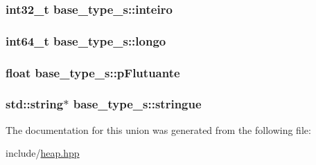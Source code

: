 \hypertarget{unionbase__type__s_aa8aa0d18e53aaef1b14d4c87779938ba}{
\subsubsection[{inteiro}]{\setlength{\rightskip}{0pt plus 5cm}int32\+\_\+t base\+\_\+type\+\_\+s\+::inteiro}}\label{unionbase__type__s_aa8aa0d18e53aaef1b14d4c87779938ba}
\hypertarget{unionbase__type__s_a1bcfa1e04911f2503e87dacad3d9fe21}{
\subsubsection[{longo}]{\setlength{\rightskip}{0pt plus 5cm}int64\+\_\+t base\+\_\+type\+\_\+s\+::longo}}\label{unionbase__type__s_a1bcfa1e04911f2503e87dacad3d9fe21}
\hypertarget{unionbase__type__s_aeb2c8259e1193e8480d6316abe158b0f}{
\subsubsection[{p\+Flutuante}]{\setlength{\rightskip}{0pt plus 5cm}float base\+\_\+type\+\_\+s\+::p\+Flutuante}}\label{unionbase__type__s_aeb2c8259e1193e8480d6316abe158b0f}
\hypertarget{unionbase__type__s_ab246b2b35057f95ce992e7083086bae5}{
\subsubsection[{stringue}]{\setlength{\rightskip}{0pt plus 5cm}std\+::string$\ast$ base\+\_\+type\+\_\+s\+::stringue}}\label{unionbase__type__s_ab246b2b35057f95ce992e7083086bae5}


The documentation for this union was generated from the following file\+:\begin{DoxyCompactItemize}
\item 
include/\hyperlink{heap_8hpp}{heap.\+hpp}\end{DoxyCompactItemize}
